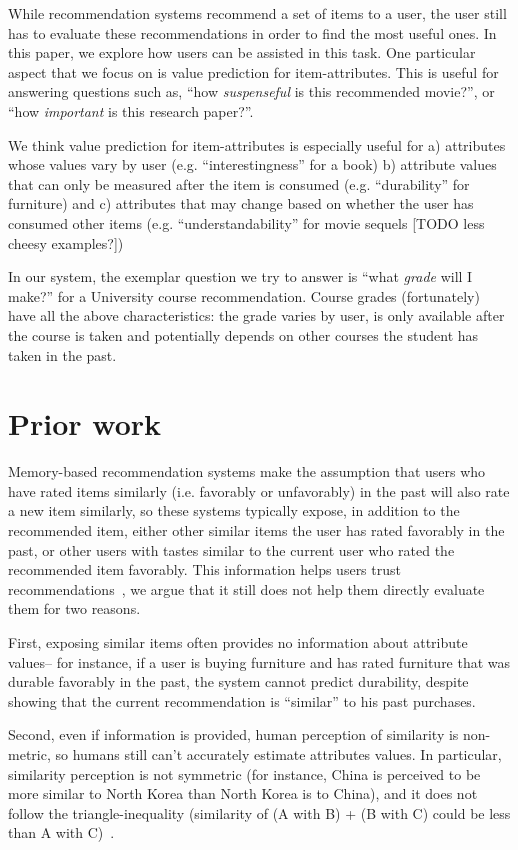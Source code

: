 \documentclass{article} %
\begin{document}
While recommendation systems recommend a set of items to a user, the user still has to evaluate these recommendations in order to find the most useful ones. In this paper, we explore how users can be assisted in this task. One particular aspect that we focus on is value prediction for item-attributes. This is useful for answering questions such as, ``how \textit{suspenseful} is this recommended movie?'', or ``how \textit{important} is this research paper?''. 

We think value prediction for item-attributes is especially useful for a) attributes whose values vary by user (e.g. ``interestingness'' for a book) b) attribute values that can only be measured after the item is consumed (e.g. ``durability'' for furniture) and c) attributes that may change based on whether the user has consumed other items (e.g. ``understandability'' for movie sequels [TODO less cheesy examples?]) 

In our system, the exemplar question we try to answer is ``what \textit{grade} will I make?'' for a University course recommendation. Course grades (fortunately) have all the above characteristics: the grade varies by user, is only available after the course is taken and potentially depends on other courses the student has taken in the past.

\section{Prior work}
Memory-based recommendation systems make the assumption that users who have rated items similarly (i.e. favorably or unfavorably) in the past will also rate a new item similarly, so these systems typically expose, in addition to the recommended item, either other similar items the user has rated favorably in the past, or other users with tastes similar to the current user who rated the recommended item favorably. This information helps users trust recommendations~\cite{o2005trust, adomavicius2005toward}, we argue that it still does not help them directly evaluate them for two reasons.

First, exposing similar items often provides no information about attribute values-- for instance, if a user is buying furniture and has rated furniture that was durable favorably in the past, the system cannot predict durability, despite showing that the current recommendation is ``similar'' to his past purchases. 

Second, even if information is provided, human perception of similarity is non-metric, so humans still can't accurately estimate attributes values. In particular, similarity perception is not symmetric (for instance, China is perceived to be more similar to North Korea than North Korea is to China), and it does not follow the triangle-inequality (similarity of (A with B) + (B with C) could be less than A with C)~\cite{tversky1982similarity}.
\end{document}
